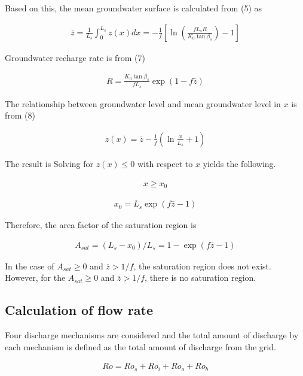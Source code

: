 Based on this, the mean groundwater surface is calculated from (5) as

\begin{eqnarray}
 \overline{z} = \frac 1{L_s}\int_0^{L_s} z(x) dx
 = - \frac1{f}\left[
 \ln \left( \frac{f L_s R}{K_0 \tan\beta_s}\right) -1
\right]
\end{eqnarray}

Groundwater recharge rate is from (7)

\begin{eqnarray}
 R = \frac{K_0 \tan\beta_s}{f L_s}\exp(1-f \overline{z})
\end{eqnarray}

The relationship between groundwater level and mean groundwater level in
\(x\) is from (8)

\begin{eqnarray}
 z(x) = \overline{z} - \frac{1}{f}\left(
\ln \frac{x}{L_s} + 1
\right)
\end{eqnarray}

The result is Solving for \(z(x) \leq 0\) with respect to \(x\) yields
the following.

\begin{eqnarray}
 x \geq x_0
\end{eqnarray}

\begin{eqnarray}
x_0 = L_s \exp(f\overline{z}-1)
\end{eqnarray}

Therefore, the area factor of the saturation region is

\begin{eqnarray}
 A_{sat} = (L_s - x_0)/ L_s = 1 - \exp(f\overline{z}-1)
\end{eqnarray}

In the case of \(A_{sat} \geq 0\) and \(\overline{z} > 1/f\), the
saturation region does not exist. However, for the \(A_{sat} \geq 0\)
and \(\overline{z} > 1/f\), there is no saturation region.

\hypertarget{calculation-of-flow-rate}{%
\subsection{Calculation of flow rate}\label{calculation-of-flow-rate}}

Four discharge mechanisms are considered and the total amount of
discharge by each mechanism is defined as the total amount of discharge
from the grid.

\begin{eqnarray}
 Ro = Ro_s + Ro_i + Ro_o + Ro_b
\end{eqnarray}

